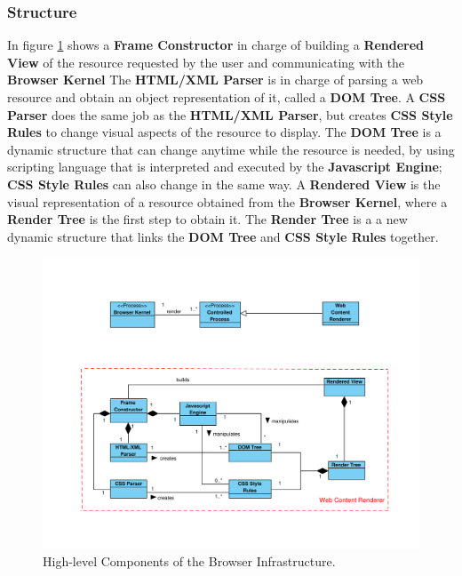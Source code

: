 \documentclass{sig-alternate-05-2015}
\begin{document}
    \subsubsection*{Structure}
    In figure \ref{fig:WCR} shows a \textbf{Frame Constructor} in charge of building a \textbf{Rendered View} of the resource requested by the user and communicating with the \textbf{Browser Kernel} The \textbf{HTML/XML Parser} is in charge of parsing a web resource and obtain an object representation of it, called a \textbf{DOM Tree}. A \textbf{CSS Parser} does the same job as the \textbf{HTML/XML Parser}, but creates \textbf{CSS Style Rules} to change visual aspects of the resource to display. The \textbf{DOM Tree} is a dynamic structure that can change anytime while the resource is needed, by using scripting language that is interpreted and executed by the \textbf{Javascript Engine}; \textbf{CSS Style Rules} can also change in the same way. A \textbf{Rendered View} is the visual representation of a resource obtained from the \textbf{Browser Kernel}, where a \textbf{Render Tree} is the first step to obtain it. The \textbf{Render Tree} is a a new dynamic structure that links the \textbf{DOM Tree} and \textbf{CSS Style Rules} together.

    \begin{figure}[h!t]
    \vspace*{-2cm}
      \centering
      \includegraphics[scale=0.65]{figures/WebContentRenderer.pdf}
      \vspace*{-2.5cm}
      \caption{High-level Components of the Browser Infrastructure.}
      \label{fig:WCR}
    \end{figure}
\end{document}
